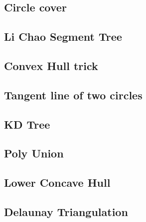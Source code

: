\documentclass[a4paper,10pt,twocolumn,oneside]{article}
\begin{document}
\subsection{Circle cover}


%

\subsection{Li Chao Segment Tree}


\subsection{Convex Hull trick}


%

\subsection{Tangent line of two circles}


\subsection{KD Tree}


\subsection{Poly Union}


\subsection{Lower Concave Hull}


\subsection{Delaunay Triangulation}

\end{document}
